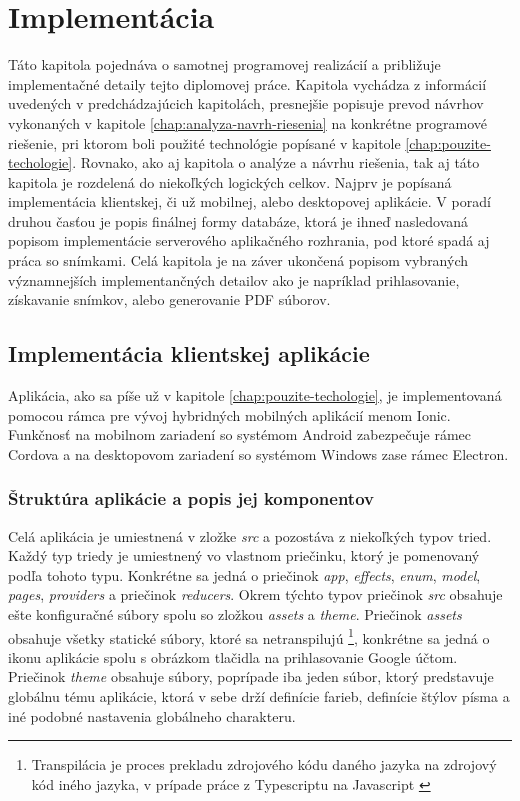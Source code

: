 \chapter{Implementácia}
\label{chap:implementacia}
Táto kapitola pojednáva o samotnej programovej realizácií a približuje implementačné detaily tejto diplomovej práce. Kapitola vychádza z informácií uvedených v predchádzajúcich kapitolách, presnejšie popisuje prevod návrhov vykonaných v kapitole \ref{chap:analyza-navrh-riesenia} na konkrétne programové riešenie, pri ktorom boli použité technológie popísané v kapitole \ref{chap:pouzite-techologie}.  Rovnako, ako aj kapitola o analýze a návrhu riešenia, tak aj táto kapitola je rozdelená do niekoľkých logických celkov. Najprv je popísaná implementácia klientskej, či už mobilnej, alebo desktopovej aplikácie. V poradí druhou časťou je popis finálnej formy databáze, ktorá je ihneď nasledovaná popisom implementácie serverového aplikačného rozhrania, pod ktoré  spadá aj práca so snímkami. Celá kapitola je na záver ukončená popisom vybraných významnejších implementančných detailov ako je napríklad prihlasovanie, získavanie snímkov, alebo generovanie PDF súborov.

\section{Implementácia klientskej aplikácie}
Aplikácia, ako sa píše už v kapitole \ref{chap:pouzite-techologie}, je implementovaná pomocou rámca pre vývoj hybridných mobilných aplikácií menom Ionic. Funkčnosť na mobilnom zariadení so systémom Android zabezpečuje rámec Cordova a na desktopovom zariadení so systémom Windows zase rámec Electron.

\subsection{Štruktúra aplikácie a popis jej komponentov}
Celá aplikácia je umiestnená v zložke \textit{src} a pozostáva z niekoľkých typov tried. Každý typ triedy je umiestnený vo vlastnom priečinku, ktorý je pomenovaný podľa tohoto typu. Konkrétne sa jedná o priečinok \textit{app}, \textit{effects}, \textit{enum}, \textit{model}, \textit{pages}, \textit{providers} a priečinok \textit{reducers}. Okrem týchto typov priečinok \textit{src} obsahuje ešte konfiguračné súbory spolu so zložkou \textit{assets} a \textit{theme}. Priečinok \textit{assets} obsahuje všetky statické súbory, ktoré sa netranspilujú \footnote{Transpilácia je proces prekladu zdrojového kódu daného jazyka na zdrojový kód iného jazyka, v prípade práce z Typescriptu na Javascript \cite{Sengstacke2542016}}, konkrétne sa jedná o ikonu aplikácie spolu s obrázkom tlačidla na prihlasovanie Google účtom. Priečinok \textit{theme} obsahuje súbory, poprípade iba jeden súbor, ktorý predstavuje globálnu tému aplikácie, ktorá v sebe drží definície farieb, definície štýlov písma a iné podobné nastavenia globálneho charakteru.

